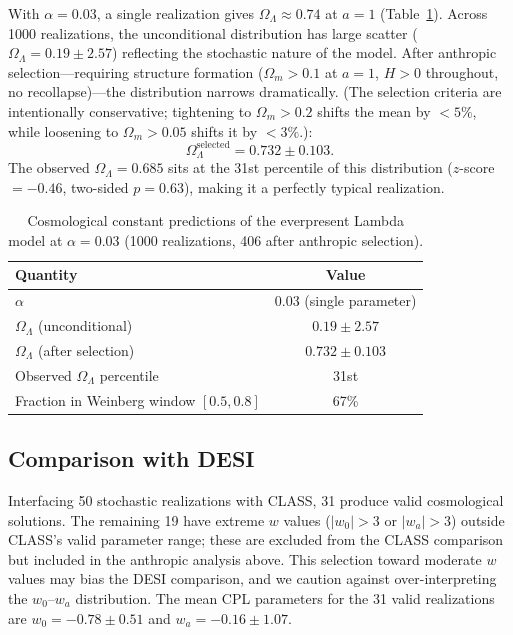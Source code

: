 \documentclass[aps,prd,twocolumn,superscriptaddress,nofootinbib]{revtex4-2}
\begin{document}
With $\alpha = 0.03$, a single realization gives $\Omega_\Lambda \approx 0.74$ at $a = 1$ (Table~\ref{tab:omega}). Across 1000 realizations, the unconditional distribution has large scatter ($\Omega_\Lambda = 0.19 \pm 2.57$) reflecting the stochastic nature of the model. After anthropic selection---requiring structure formation ($\Omega_m > 0.1$ at $a = 1$, $H > 0$ throughout, no recollapse)---the distribution narrows dramatically. (The selection criteria are intentionally conservative; tightening to $\Omega_m > 0.2$ shifts the mean by $< 5\%$, while loosening to $\Omega_m > 0.05$ shifts it by $< 3\%$.):
\begin{equation}
\Omega_\Lambda^{\mathrm{selected}} = 0.732 \pm 0.103.
\end{equation}
The observed $\Omega_\Lambda = 0.685$ sits at the 31st percentile of this distribution ($z$-score $= -0.46$, two-sided $p = 0.63$), making it a perfectly typical realization.

\begin{table}[h]
\centering
\begin{tabular}{lc}
\toprule
Quantity & Value \\
\midrule
$\alpha$ & 0.03 (single parameter) \\
$\Omega_\Lambda$ (unconditional) & $0.19 \pm 2.57$ \\
$\Omega_\Lambda$ (after selection) & $0.732 \pm 0.103$ \\
Observed $\Omega_\Lambda$ percentile & 31st \\
Fraction in Weinberg window $[0.5, 0.8]$ & 67\% \\
\bottomrule
\end{tabular}
\caption{Cosmological constant predictions of the everpresent Lambda model at $\alpha = 0.03$ (1000 realizations, 406 after anthropic selection).}
\label{tab:omega}
\end{table}

\subsection{Comparison with DESI}

Interfacing 50 stochastic realizations with CLASS, 31 produce valid cosmological solutions. The remaining 19 have extreme $w$ values ($|w_0| > 3$ or $|w_a| > 3$) outside CLASS's valid parameter range; these are excluded from the CLASS comparison but included in the anthropic analysis above. This selection toward moderate $w$ values may bias the DESI comparison, and we caution against over-interpreting the $w_0$--$w_a$ distribution. The mean CPL parameters for the 31 valid realizations are $w_0 = -0.78 \pm 0.51$ and $w_a = -0.16 \pm 1.07$.
\end{document}

